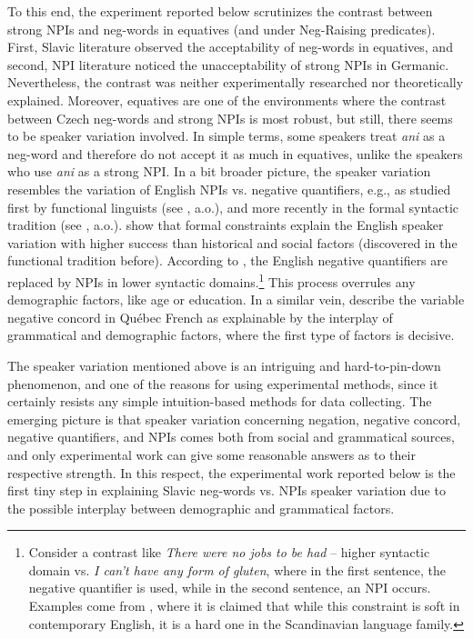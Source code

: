 \documentclass[output=paper,colorlinks,citecolor=brown]{langscibook}
\begin{document}
To this end, the experiment reported below scrutinizes the contrast between strong NPIs and neg-words in equatives (and under Neg-Raising predicates). First, Slavic literature observed the acceptability of neg-words in equatives, and second, NPI literature noticed the unacceptability of strong NPIs in Germanic. Nevertheless, the contrast was neither experimentally researched nor theoretically explained. Moreover, equatives are one of the environments where the contrast between Czech neg-words and strong NPIs is most robust, but still, there seems to be speaker variation involved. In simple terms, some speakers treat \emph{ani} as a neg-word and therefore do not accept it as much in equatives, unlike the speakers who use \textit{ani} as a strong NPI. In a bit broader picture, the speaker variation resembles the variation of English NPIs vs. negative quantifiers, e.g., as studied first by functional linguists (see \citealt{tottie1991negation}, a.o.), and more recently in the formal syntactic tradition (see \citealt{burnett2015variable,burnett2018structural}, a.o.). \citet{burnett2015variable,burnett2018structural} show that formal constraints explain the English speaker variation with higher success than historical and social factors (discovered in the functional tradition before). According to \citet{burnett2018structural}, the English negative quantifiers are replaced by NPIs in lower syntactic domains.\footnote{Consider a contrast like \textit{There were no jobs to be had} -- higher syntactic domain vs. \textit{I can't have any form of gluten}, where in the first sentence, the negative quantifier is used, while in the second sentence, an NPI occurs. Examples come from \citet{burnett2018structural}, where it is claimed that while this constraint is soft in contemporary English, it is a hard one in the Scandinavian language family.} This process overrules any demographic factors, like age or education. In a similar vein, \citet{burnett2015variable} describe the variable negative concord in Québec French as explainable by the interplay of grammatical and demographic factors, where the first type of factors is decisive.
  

The speaker variation mentioned above is an intriguing and hard-to-pin-down phenomenon, and one of the reasons for using experimental methods, since it certainly resists any simple intuition-based methods for data collecting.  The emerging picture is that speaker variation concerning negation, negative concord, negative quantifiers, and NPIs comes both from social and grammatical sources, and only experimental work can give some reasonable answers as to their respective strength. In this respect, the experimental work reported below is the first tiny step in explaining Slavic neg-words vs. NPIs speaker variation due to the possible interplay between demographic and grammatical factors.
\end{document}
